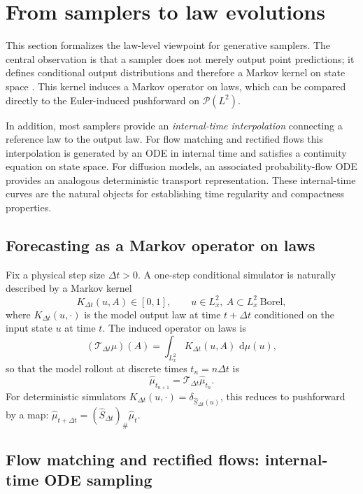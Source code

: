 \documentclass{article}
\numberwithin{equation}{section}
\theoremstyle{plain}
\theoremstyle{definition}
\theoremstyle{remark}
\newcommand{\Pcal}{\mathcal{P}}
\newcommand{\dd}{\,\mathrm{d}}
\begin{document}
\section{From samplers to law evolutions}
\label{sec:sampler}

This section formalizes the law-level viewpoint for generative samplers. The central observation is that a sampler does
not merely output point predictions; it defines conditional output distributions and therefore a Markov kernel on state
space \cite{schiff2024dyslim}. This kernel induces a Markov operator on laws, which can be compared directly to the Euler-induced pushforward on
$\Pcal(L^2)$.

In addition, most samplers provide an \emph{internal-time interpolation} connecting a reference law to the output law.
For flow matching and rectified flows this interpolation is generated by an ODE in internal time and satisfies a
continuity equation on state space. For diffusion models, an associated probability-flow ODE provides an analogous
deterministic transport representation. These internal-time curves are the natural objects for establishing time
regularity and compactness properties.

\subsection{Forecasting as a Markov operator on laws}

Fix a physical step size $\Delta t>0$. A one-step conditional simulator is naturally described by a Markov kernel
\[
K_{\Delta t}(u,A)\in[0,1],\qquad u\in L^2_x,\ A\subset L^2_x\ \text{Borel},
\]
where $K_{\Delta t}(u,\cdot)$ is the model output law at time $t+\Delta t$ conditioned on the input state $u$ at time $t$.
The induced operator on laws is
\begin{equation}\label{eq:law-op}
(\mathcal T_{\Delta t}\mu)(A)=\int_{L^2_x}K_{\Delta t}(u,A)\,\dd\mu(u),
\end{equation}
so that the model rollout at discrete times $t_n=n\Delta t$ is
\[
\widehat\mu_{t_{n+1}} = \mathcal T_{\Delta t}\widehat\mu_{t_n}.
\]
For deterministic simulators $K_{\Delta t}(u,\cdot)=\delta_{\widehat S_{\Delta t}(u)}$, this reduces to pushforward by a map:
$\widehat\mu_{t+\Delta t}=(\widehat S_{\Delta t})_\#\widehat\mu_t$.

\subsection{Flow matching and rectified flows: internal-time ODE sampling}
\end{document}
